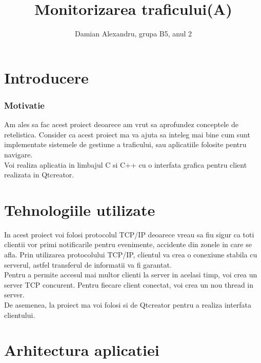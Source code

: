 \documentclass[runningheads]{llncs}
\begin{document}
\title{Monitorizarea traficului(A)}
\author{Damian Alexandru, grupa B5, anul 2}
\maketitle





\section {Introducere}
\subsubsection{Motivatie}
Am ales sa fac acest proiect deoarece am vrut sa aprofundez conceptele de retelistica. Consider ca acest proiect ma va ajuta sa inteleg mai bine cum sunt implementate sistemele de gestiune a traficului, sau aplicatiile folosite pentru navigare.\\

Voi realiza aplicatia in limbajul C si C++ cu o interfata grafica pentru client realizata in Qtcreator.

\section {Tehnologiile utilizate}

In acest proiect voi folosi protocolul TCP/IP deoarece vreau sa fiu sigur ca toti clientii vor primi notificarile pentru evenimente, accidente din zonele in care se afla. Prin utilizarea protocolului TCP/IP, clientul va crea o conexiune stabila cu serverul, astfel transferul de informatii va fi garantat.\\

Pentru a permite accesul mai multor clienti la server in acelasi timp, voi crea un server TCP concurent. Pentru fiecare client conectat, voi crea un nou thread in server.\\

De asemenea, la proiect ma voi folosi si de Qtcreator pentru a realiza interfata clientului.\\


\section{Arhitectura aplicatiei}
\end{document}

